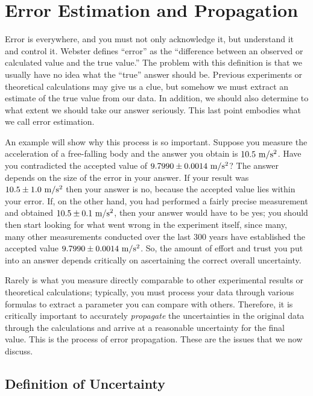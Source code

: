 \section{Error Estimation and Propagation}

Error is everywhere, and you must not only acknowledge it, but understand it 
and control it. Webster defines ``error'' as the ``difference between 
an observed or calculated value and the true value.'' The problem with this 
definition is that we usually have no idea what the ``true'' answer should be.
Previous experiments or theoretical calculations may give us a clue, but 
somehow we must extract an estimate of the true value from our data. In 
addition, we should also determine to what extent we should take our answer 
seriously. This last point embodies what we call error estimation. 

An example will show why this process is so important. Suppose you measure the
acceleration of a free-falling body and the answer you obtain is $10.5~{\rm
 m/s^2}$. Have you contradicted the accepted value of $9.7990 \pm 0.0014~{\rm
 m/s^2}$? The answer depends on the size of the error in your answer. If your 
result was $10.5 \pm 1.0~{\rm m/s^2}$ then your answer is no, because the 
accepted value lies within your error. If, on the other hand, you had 
performed a fairly precise measurement and obtained $10.5 \pm 0.1~{\rm 
m/s^2}$, then your answer would have to be yes; you should then start looking 
for what went wrong in the experiment itself, since many, many other 
measurements conducted over the last 300 years have established the accepted 
value $9.7990 \pm 0.0014~{\rm m/s^2}$. So, the amount of effort and trust you 
put into an answer depends critically on ascertaining the correct overall 
uncertainty.

Rarely is what you measure directly comparable to other experimental results 
or theoretical calculations; typically, you must process your data through 
various formulas to extract a parameter you can compare with others. 
Therefore, it is critically important to accurately {\em propagate} the 
uncertainties in the original data through the calculations and arrive at a 
reasonable uncertainty for the final value. This is the process of error 
propagation. These are the issues that we now discuss.

\subsection{Definition of Uncertainty}

